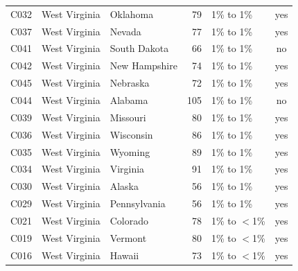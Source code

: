 \documentclass[a4paper,10pt]{article}
\newif\ifreviewmarks
\newcommand{\reviewrule}{\noindent{\color{BrickRed}\rule{\linewidth}{0.8pt}}}
\newenvironment{drafted}[1][]{%
  \ifreviewmarks\par\addvspace{\medskipamount}\reviewrule\par\nopagebreak
  \noindent{\color{BrickRed}\sffamily\footnotesize\textbf{Thesis Draft}\quad #1\hfill review}\par\nopagebreak\smallskip\fi}{%
  \ifreviewmarks\par\smallskip\noindent{\color{BrickRed}\sffamily\footnotesize end of thesis draft}\par\nopagebreak\reviewrule\par\medskip\fi}
\begin{document}
\begin{drafted}[plain-language layer: churn100-s2-c1]
{\begin{longtable}{@{}lllrlc@{}}
C032 & West Virginia & Oklahoma & 79 & 1\% to 1\% & \textcolor{OliveGreen}{yes} \\
C037 & West Virginia & Nevada & 77 & 1\% to 1\% & \textcolor{OliveGreen}{yes} \\
C041 & West Virginia & South Dakota & 66 & 1\% to 1\% & \textcolor{BrickRed}{no} \\
C042 & West Virginia & New Hampshire & 74 & 1\% to 1\% & \textcolor{OliveGreen}{yes} \\
C045 & West Virginia & Nebraska & 72 & 1\% to 1\% & \textcolor{OliveGreen}{yes} \\
C044 & West Virginia & Alabama & 105 & 1\% to 1\% & \textcolor{BrickRed}{no} \\
C039 & West Virginia & Missouri & 80 & 1\% to 1\% & \textcolor{OliveGreen}{yes} \\
C036 & West Virginia & Wisconsin & 86 & 1\% to 1\% & \textcolor{OliveGreen}{yes} \\
C035 & West Virginia & Wyoming & 89 & 1\% to 1\% & \textcolor{OliveGreen}{yes} \\
C034 & West Virginia & Virginia & 91 & 1\% to 1\% & \textcolor{OliveGreen}{yes} \\
C030 & West Virginia & Alaska & 56 & 1\% to 1\% & \textcolor{OliveGreen}{yes} \\
C029 & West Virginia & Pennsylvania & 56 & 1\% to 1\% & \textcolor{OliveGreen}{yes} \\
C021 & West Virginia & Colorado & 78 & 1\% to $<$1\% & \textcolor{OliveGreen}{yes} \\
C019 & West Virginia & Vermont & 80 & 1\% to $<$1\% & \textcolor{OliveGreen}{yes} \\
C016 & West Virginia & Hawaii & 73 & 1\% to $<$1\% & \textcolor{OliveGreen}{yes} \\
\end{longtable}}

\end{drafted}
\end{document}
